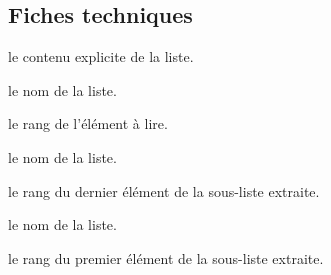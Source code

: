 \documentclass[12pt,a4paper]{article}
\begin{document}


\subsection{Fiches techniques}





\separation






\separation



\IDarg{} le contenu explicite de la liste.




\separation



 le nom de la liste.

 le rang de l'élément à lire.




\separation



 le nom de la liste.

 le rang du dernier élément de la sous-liste extraite.




\separation



 le nom de la liste.

 le rang du premier élément de la sous-liste extraite.




\separation




\end{document}
